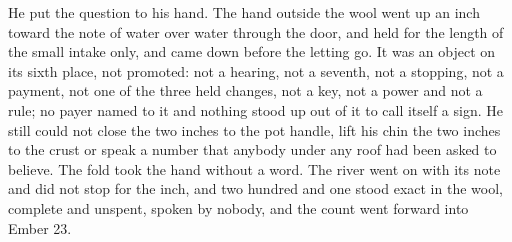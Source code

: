 He put the question to his hand. The hand outside the wool went up an inch toward the note of water over water through the door, and held for the length of the small intake only, and came down before the letting go. It was an object on its sixth place, not promoted: not a hearing, not a seventh, not a stopping, not a payment, not one of the three held changes, not a key, not a power and not a rule; no payer named to it and nothing stood up out of it to call itself a sign. He still could not close the two inches to the pot handle, lift his chin the two inches to the crust or speak a number that anybody under any roof had been asked to believe. The fold took the hand without a word. The river went on with its note and did not stop for the inch, and two hundred and one stood exact in the wool, complete and unspent, spoken by nobody, and the count went forward into Ember 23.
